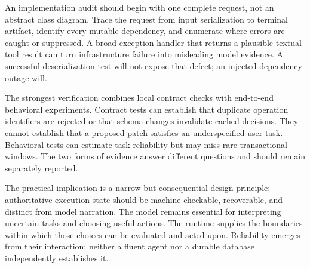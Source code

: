 An implementation audit should begin with one complete request, not an abstract class diagram. Trace the request from input serialization to terminal artifact, identify every mutable dependency, and enumerate where errors are caught or suppressed. A broad exception handler that returns a plausible textual tool result can turn infrastructure failure into misleading model evidence. A successful deserialization test will not expose that defect; an injected dependency outage will.

The strongest verification combines local contract checks with end-to-end behavioral experiments. Contract tests can establish that duplicate operation identifiers are rejected or that schema changes invalidate cached decisions. They cannot establish that a proposed patch satisfies an underspecified user task. Behavioral tests can estimate task reliability but may miss rare transactional windows. The two forms of evidence answer different questions and should remain separately reported.

The practical implication is a narrow but consequential design principle: authoritative execution state should be machine-checkable, recoverable, and distinct from model narration. The model remains essential for interpreting uncertain tasks and choosing useful actions. The runtime supplies the boundaries within which those choices can be evaluated and acted upon. Reliability emerges from their interaction; neither a fluent agent nor a durable database independently establishes it.
